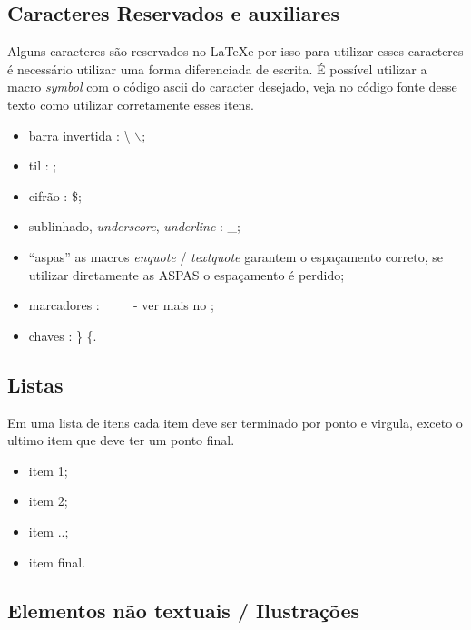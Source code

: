 \subsection{Caracteres Reservados e auxiliares}



Alguns caracteres são reservados no \LaTeX \space e por isso para utilizar esses caracteres é necessário utilizar uma forma diferenciada de escrita. É possível utilizar a macro \emph{symbol} com o código \ac{ascii} do caracter desejado, veja no código fonte desse texto como utilizar corretamente esses itens.


\begin{itemize}
\item barra invertida : \textbackslash   {}    $\backslash$;
\item til  :   ;
\item cifrão : \$;
\item sublinhado, \emph{underscore}, \emph{underline} : \_;
\item \enquote{aspas} as macros \emph{enquote} / \emph{textquote} garantem o espaçamento correto, se utilizar diretamente as ASPAS o espaçamento é perdido;
\item marcadores : \cmark\ \xmark\ \circlemark\  \ - ver mais no ;
\item chaves : \} \{.
\end{itemize}

\subsection{Listas}

Em uma lista de itens cada item deve ser terminado por ponto e virgula, exceto o ultimo item que deve ter um ponto final.

\begin{itemize}
\item item 1;
\item item 2;
\item item ..;
\item item final.
\end{itemize}






\subsection{Elementos não textuais / Ilustrações}
\label{elementos-nao-textuais}

